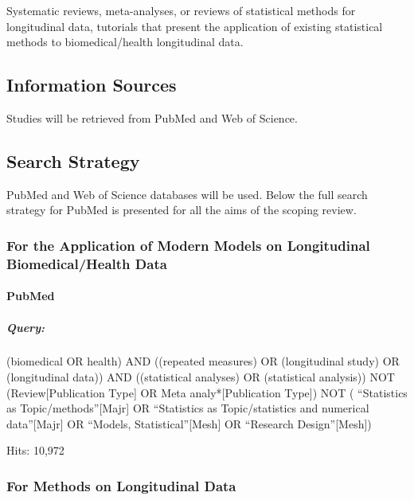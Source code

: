 \documentclass[
]{article}
\let\oldparagraph\paragraph
\renewcommand{\paragraph}[1]{\oldparagraph{#1}\mbox{}}
\let\oldsubparagraph\subparagraph
\renewcommand{\subparagraph}[1]{\oldsubparagraph{#1}\mbox{}}
\begin{document}
Systematic reviews, meta-analyses, or reviews of statistical methods for
longitudinal data, tutorials that present the application of existing
statistical methods to biomedical/health longitudinal data.

\hypertarget{information-sources}{%
\subsection{Information Sources}\label{information-sources}}

Studies will be retrieved from PubMed and Web of Science.

\hypertarget{search-strategy}{%
\subsection{Search Strategy}\label{search-strategy}}

PubMed and Web of Science databases will be used. Below the full search
strategy for PubMed is presented for all the aims of the scoping review.

\hypertarget{for-the-application-of-modern-models-on-longitudinal-biomedicalhealth-data}{%
\subsubsection{For the Application of Modern Models on Longitudinal
Biomedical/Health
Data}\label{for-the-application-of-modern-models-on-longitudinal-biomedicalhealth-data}}

\hypertarget{pubmed}{%
\paragraph{PubMed}\label{pubmed}}

\hypertarget{query}{%
\subparagraph{Query:}\label{query}}

(biomedical OR health) AND ((repeated measures) OR (longitudinal study)
OR (longitudinal data)) AND ((statistical analyses) OR (statistical
analysis)) NOT (Review{[}Publication Type{]} OR Meta
analy*{[}Publication Type{]}) NOT ( ``Statistics as
Topic/methods''{[}Majr{]} OR ``Statistics as Topic/statistics and
numerical data''{[}Majr{]} OR ``Models, Statistical''{[}Mesh{]} OR
``Research Design''{[}Mesh{]})

Hits: 10,972

\hypertarget{for-methods-on-longitudinal-data}{%
\subsubsection{For Methods on Longitudinal
Data}\label{for-methods-on-longitudinal-data}}
\end{document}
